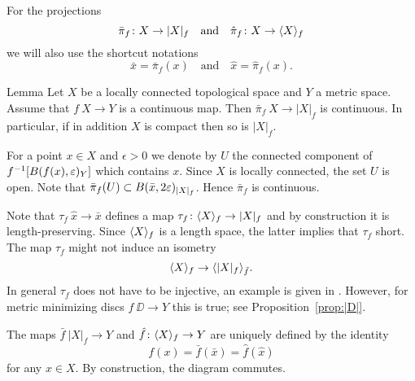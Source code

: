 \documentclass{article}
\begin{document}
For the projections 
\[\bar \pi_f\colon X\to |X|_f\quad\text{and}\quad \hat \pi_f\colon X\to \langle X\rangle_f\]
we will also use the shortcut notations 
\[\bar x=\bar\pi_f(x) \quad\text{and}\quad  \hat x= \hat \pi_f(x).\]

\begin{thm}{Lemma}\label{lem:picont}
Let $X$ be a locally connected topological space and $Y$ a metric space. Assume that $f\:X\to Y$ is a continuous map. 
Then $\bar\pi_f\:X\to|X|_f$ is continuous.
In particular, if in addition $X$ is compact then so is $|X|_f$.
\end{thm}

For a point $x\in X$ and $\epsilon>0$ we denote by $U$
the connected component of $f^{-1}[B(f(x),\varepsilon)_{Y}]$ which contains
$x$. Since $X$ is locally connected, the set $U$ is open. 
Note that $\bar\pi_f(U)\subset B(\bar x,2\varepsilon)_{|X|_f}$. Hence
$\bar\pi_f$ is continuous.
\qeds



\begin{wrapfigure}{r}{33 mm}
\end{wrapfigure}

Note that $\tau_f\: \hat x\to \bar x$ defines a map $\tau_f\colon \langle X\rangle_f\to |X|_f$ and by construction it is length-preserving.
Since $\langle X\rangle_f$ is a length space, the latter implies that $\tau_f$ short.
The map $\tau_f$ might not induce an isometry
\[\langle X\rangle_f\to\langle|X|_f\rangle_{\bar f}.\]
In general $\tau_f$ does not have to be injective, an example is given in \cite[4.2]{petrunin-intrinisic}.
However, for metric minimizing discs $f\:\DD\to Y$ this is true; see
Proposition~\ref{prop:|D|}.

The maps $\bar f\:|X|_f\to Y$ and $ \hat f\colon\langle X\rangle_f\to Y$ are uniquely defined by the identity
\[f(x)=\bar f(\bar x)=  \hat f( \hat x)\] for any $x\in X$.
By construction, the diagram commutes.
\end{document}
